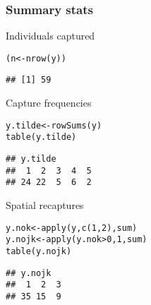 \documentclass[color=usenames,dvipsnames]{beamer}\usepackage[]{graphicx}\usepackage[]{color}
\makeatletter
\newcommand{\hlnum}[1]{\textcolor[rgb]{0.69,0.494,0}{#1}}%
\newcommand{\hlopt}[1]{\textcolor[rgb]{0,0,0}{#1}}%
\newcommand{\hlstd}[1]{\textcolor[rgb]{0,0,0}{#1}}%
\newcommand{\hlkwb}[1]{\textcolor[rgb]{0,0.341,0.682}{#1}}%
\newcommand{\hlkwd}[1]{\textcolor[rgb]{0.004,0.004,0.506}{#1}}%
\newenvironment{kframe}{%
 \def\at@end@of@kframe{}%
 \ifinner\ifhmode%
  \def\at@end@of@kframe{\end{minipage}}%
  \begin{minipage}{\columnwidth}%
 \fi\fi%
 \def\FrameCommand##1{\hskip\@totalleftmargin \hskip-\fboxsep
 \colorbox{shadecolor}{##1}\hskip-\fboxsep
     \hskip-\linewidth \hskip-\@totalleftmargin \hskip\columnwidth}%
 \MakeFramed {\advance\hsize-\width
   \@totalleftmargin\z@ \linewidth\hsize
   \@setminipage}}%
 {\par\unskip\endMakeFramed%
 \at@end@of@kframe}
\newenvironment{knitrout}{}{} %
\makeatother
\begin{document}
\begin{frame}[fragile]
  \frametitle{Summary stats}
  \small
  Individuals captured
\begin{knitrout}\footnotesize
{}\color{fgcolor}\begin{kframe}
\begin{alltt}
\hlstd{(n} \hlkwb{<-} \hlkwd{nrow}\hlstd{(y))}
\end{alltt}
\begin{verbatim}
## [1] 59
\end{verbatim}
\end{kframe}
\end{knitrout}
\pause \vfill
  Capture frequencies
  \vspace{-6pt}  
\begin{knitrout}\footnotesize
{}\color{fgcolor}\begin{kframe}
\begin{alltt}
\hlstd{y.tilde} \hlkwb{<-} \hlkwd{rowSums}\hlstd{(y)}
\hlkwd{table}\hlstd{(y.tilde)}
\end{alltt}
\begin{verbatim}
## y.tilde
##  1  2  3  4  5 
## 24 22  5  6  2
\end{verbatim}
\end{kframe}
\end{knitrout}
\pause
\vfill
Spatial recaptures
  \vspace{-6pt}  
\begin{knitrout}\footnotesize
{}\color{fgcolor}\begin{kframe}
\begin{alltt}
\hlstd{y.nok} \hlkwb{<-} \hlkwd{apply}\hlstd{(y,} \hlkwd{c}\hlstd{(}\hlnum{1}\hlstd{,} \hlnum{2}\hlstd{), sum)}
\hlstd{y.nojk} \hlkwb{<-} \hlkwd{apply}\hlstd{(y.nok}\hlopt{>}\hlnum{0}\hlstd{,} \hlnum{1}\hlstd{, sum)}
\hlkwd{table}\hlstd{(y.nojk)}
\end{alltt}
\begin{verbatim}
## y.nojk
##  1  2  3 
## 35 15  9
\end{verbatim}
\end{kframe}
\end{knitrout}
\end{frame}
\end{document}
